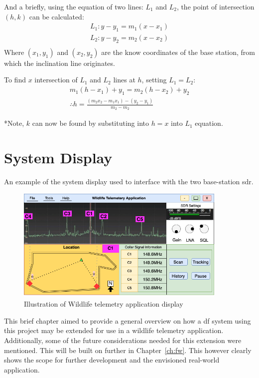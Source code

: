 \documentclass[class=report,11pt,crop=false]{standalone}
\begin{document}
\newpage
And a briefly, using the equation of two lines: $L_1$ and $L_2$, the point of intersection $(h,k)$ can be calculated:
\begin{equation*}
    \begin{split}
        L_1 : y-y_1 = m_1 (x-x_1) \\
        L_2 : y-y_2 = m_2 (x-x_2) \\
    \end{split}
\end{equation*}
Where $(x_1,y_1)$ and $(x_2,y_2)$ are the know coordinates of the base station, from which the inclination line originates. 

To find $x$ intersection of $L_1$ and $L_2$ lines at $h$, setting $L_1 = L_2$:
\begin{equation*}
    \begin{split}
        m_1(h-x_1) + y_1 = m_2(h-x_2) + y_2 \\
        \therefore h = \frac{(m_2 x_2 - m_1 x_1) - (y_2 - y_1)}{m_2 - m_2}
    \end{split}
\end{equation*}

*Note, $k$ can now be found by substituting into $h = x$ into $L_1$ equation. 


\section{System Display}
An example of the system display used to interface with the two base-station \gls{sdr}.
\begin{figure}[h]
    \centering
    \includegraphics[width=0.9\textwidth]{Images/diagrams/WLT Display.drawio.png}
    \caption{Illustration of Wildlife telemetry application display}
    \label{fig:application-display}
\end{figure}


This brief chapter aimed to provide a general overview on how a \gls{df} system using this project may be extended for use in a wildlife telemetry application. Additionally, some of the future considerations needed for this extension were mentioned.  This will be built on further in Chapter~\ref{ch:fw}. This however clearly shows the scope for further development and the envisioned real-world application. 

\ifstandalone
%
\printnoidxglossary[type=\acronymtype,nonumberlist]
\fi
\end{document}
